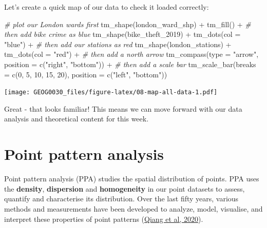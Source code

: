 \documentclass[
]{book}
\newenvironment{Shaded}{\begin{snugshade}}{\end{snugshade}}
\newcommand{\AttributeTok}[1]{\textcolor[rgb]{0.77,0.63,0.00}{#1}}
\newcommand{\CommentTok}[1]{\textcolor[rgb]{0.56,0.35,0.01}{\textit{#1}}}
\newcommand{\DecValTok}[1]{\textcolor[rgb]{0.00,0.00,0.81}{#1}}
\newcommand{\FunctionTok}[1]{\textcolor[rgb]{0.00,0.00,0.00}{#1}}
\newcommand{\NormalTok}[1]{#1}
\newcommand{\SpecialCharTok}[1]{\textcolor[rgb]{0.00,0.00,0.00}{#1}}
\newcommand{\StringTok}[1]{\textcolor[rgb]{0.31,0.60,0.02}{#1}}
\begin{document}
Let's create a quick map of our data to check it loaded correctly:

\begin{Shaded}
\begin{Highlighting}[]
\CommentTok{\# plot our London wards first}
\FunctionTok{tm\_shape}\NormalTok{(london\_ward\_shp) }\SpecialCharTok{+} \FunctionTok{tm\_fill}\NormalTok{() }\SpecialCharTok{+}
  \CommentTok{\# then add bike crime as blue}
  \FunctionTok{tm\_shape}\NormalTok{(bike\_theft\_2019) }\SpecialCharTok{+} \FunctionTok{tm\_dots}\NormalTok{(}\AttributeTok{col =} \StringTok{"blue"}\NormalTok{) }\SpecialCharTok{+}
  \CommentTok{\# then add our stations as red}
  \FunctionTok{tm\_shape}\NormalTok{(london\_stations) }\SpecialCharTok{+} \FunctionTok{tm\_dots}\NormalTok{(}\AttributeTok{col =} \StringTok{"red"}\NormalTok{) }\SpecialCharTok{+}
  \CommentTok{\# then add a north arrow}
  \FunctionTok{tm\_compass}\NormalTok{(}\AttributeTok{type =} \StringTok{"arrow"}\NormalTok{, }\AttributeTok{position =} \FunctionTok{c}\NormalTok{(}\StringTok{"right"}\NormalTok{, }\StringTok{"bottom"}\NormalTok{)) }\SpecialCharTok{+}
  \CommentTok{\# then add a scale bar}
  \FunctionTok{tm\_scale\_bar}\NormalTok{(}\AttributeTok{breaks =} \FunctionTok{c}\NormalTok{(}\DecValTok{0}\NormalTok{, }\DecValTok{5}\NormalTok{, }\DecValTok{10}\NormalTok{, }\DecValTok{15}\NormalTok{, }\DecValTok{20}\NormalTok{), }\AttributeTok{position =} \FunctionTok{c}\NormalTok{(}\StringTok{"left"}\NormalTok{, }\StringTok{"bottom"}\NormalTok{))}
\end{Highlighting}
\end{Shaded}

\texttt{[image: GEOG0030\_files/figure-latex/08-map-all-data-1.pdf]}

Great - that looks familiar! This means we can move forward with our data analysis and theoretical content for this week.

\hypertarget{point-pattern-analysis}{%
\section{Point pattern analysis}\label{point-pattern-analysis}}

Point pattern analysis (PPA) studies the spatial distribution of points. PPA uses the \textbf{density}, \textbf{dispersion} and \textbf{homogeneity} in our point datasets to assess, quantify and characterise its distribution. Over the last fifty years, various methods and measurements have been developed to analyze, model, visualise, and interpret these properties of point patterns (\href{https://gistbok.ucgis.org/bok-topics/point-pattern-analysis}{Qiang et al, 2020}).
\end{document}
